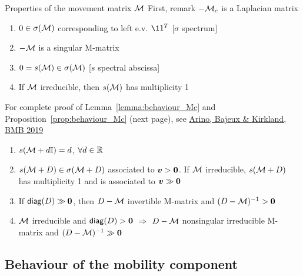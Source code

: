 \documentclass[aspectratio=169]{beamer}\usepackage[]{graphicx}\usepackage[]{xcolor}
\begin{document}
\begin{frame}{Properties of the movement matrix $\mathcal{M}$}
	First, remark $-\mathcal{M}_c$ is a Laplacian matrix
	\vfill
	\begin{lemma}\label{lemma:behaviour_Mc}
		\begin{enumerate}
			\item $0\in\sigma(\mathcal{M})$ corresponding to left e.v. $\11^T$ \hfill[$\sigma$ spectrum]
			\item $-\mathcal{M}$ is a singular M-matrix
			\item $0=s(\mathcal{M})\in\sigma(\mathcal{M})$ \hfill[$s$ spectral abscissa]
			\item If $\mathcal{M}$ irreducible, then $s(\mathcal{M})$ has multiplicity 1
		\end{enumerate}
	\end{lemma}
	\vfill
	For complete proof of Lemma~\ref{lemma:behaviour_Mc} and Proposition~\ref{prop:behaviour_Mc} (next page), see \href{http://dx.doi.org/10.1007/s11538-019-00593-1}{Arino, Bajeux \& Kirkland, BMB 2019}
\end{frame}

\begin{frame}
	\begin{proposition}
		\label{prop:behaviour_Mc}
		\begin{enumerate}
			\item $s(\mathcal{M}+d\mathbb{I})=d$, $\forall d\in\mathbb{R}$
			\item $s(\mathcal{M}+D)\in\sigma(\mathcal{M}+D)$ associated to $\bv>\b0$. If $\mathcal{M}$ irreducible, $s(\mathcal{M}+D)$ has  multiplicity 1 and is associated to $\bv\gg \b0$
			\item If $\diag (D)\gg \b0$, then $D-\mathcal{M}$ invertible M-matrix and $(D-\M)^{-1}> \b0$
			\item $\mathcal{M}$ irreducible and $\diag(D)>\b0$ $\Longrightarrow$ $D-\mathcal{M}$ nonsingular irreducible M-matrix and $(D-\M)^{-1}\gg \b0$		
		\end{enumerate}
	\end{proposition}
\end{frame}


\subsection{Behaviour of the mobility component}


\end{document}
